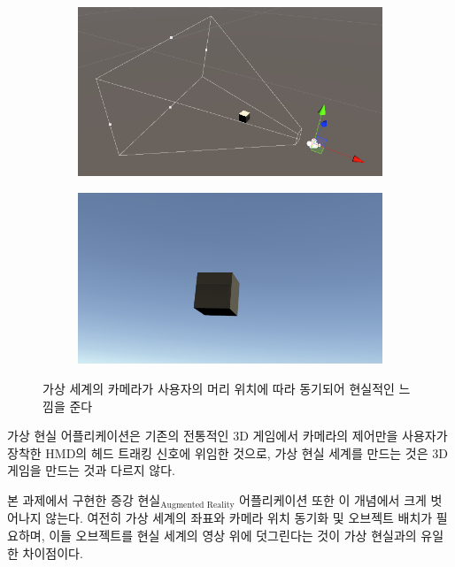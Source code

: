 \documentclass[11pt]{oblivoir}
\begin{document}
    \begin{figure}[ht]
        \centering
        \begin{subfigure}{0.4\textwidth}
            \includegraphics[width=\textwidth]{img/vr-example-camera.png}
        \end{subfigure}
        \begin{subfigure}{0.4\textwidth}
            \includegraphics[width=\textwidth]{img/vr-example-view.png}
        \end{subfigure}
        \caption{가상 세계의 카메라가 사용자의 머리 위치에 따라 동기되어 현실적인 느낌을 준다}
    \end{figure}

    가상 현실 어플리케이션은 기존의 전통적인 3D 게임에서 카메라의 제어만을 사용자가 장착한 HMD의 헤드 트래킹 신호에 위임한 것으로, 가상 현실 세계를 만드는 것은 3D 게임을 만드는 것과 다르지 않다.

    본 과제에서 구현한 증강 현실$_\text{Augmented Reality}$ 어플리케이션 또한 이 개념에서 크게 벗어나지 않는다. 여전히 가상 세계의 좌표와 카메라 위치 동기화 및 오브젝트 배치가 필요하며, 이들 오브젝트를 현실 세계의 영상 위에 덧그린다는 것이 가상 현실과의 유일한 차이점이다.
\end{document}
